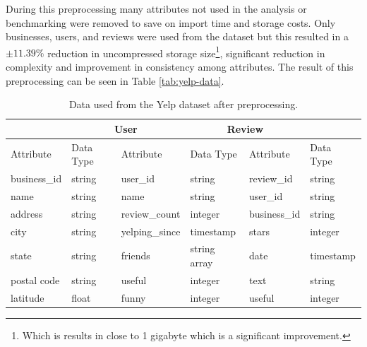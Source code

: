 During this preprocessing many attributes not used in the analysis or benchmarking were removed to save on import time and storage costs. Only businesses, users, and reviews were used from the dataset but this resulted in a $\pm11.39\%$ reduction in uncompressed storage size\footnote{Which is results in close to 1 gigabyte which is a significant improvement.}, significant reduction in complexity and improvement in consistency among attributes. The result of this preprocessing can be seen in Table \ref{tab:yelp-data}.

\begin{table}[h]
    \centering
    \caption{Data used from the Yelp dataset after preprocessing.}
    \vspace*{5mm}
    \begin{tabular}{ |p{2cm}|p{2cm}||p{2cm}|p{2cm}||p{2cm}|p{2cm}|}
        \hline
        \rowcolor{Gray}
        \multicolumn{2}{|c||}{Business} & \multicolumn{2}{|c||}{User} & \multicolumn{2}{|c|}{Review}                                           \\
        \hline
        \rowcolor{LightGray}
        Attribute                       & Data Type                   & Attribute                    & Data Type    & Attribute    & Data Type \\
        \hline
        business\_id                    & string                      & user\_id                     & string       & review\_id   & string    \\
        name                            & string                      & name                         & string       & user\_id     & string    \\
        address                         & string                      & review\_count                & integer      & business\_id & string    \\
        city                            & string                      & yelping\_since               & timestamp    & stars        & integer   \\
        state                           & string                      & friends                      & string array & date         & timestamp \\
        postal code                     & string                      & useful                       & integer      & text         & string    \\
        latitude                        & float                       & funny                        & integer      & useful       & integer   \\

\end{tabular}
\end{table}
